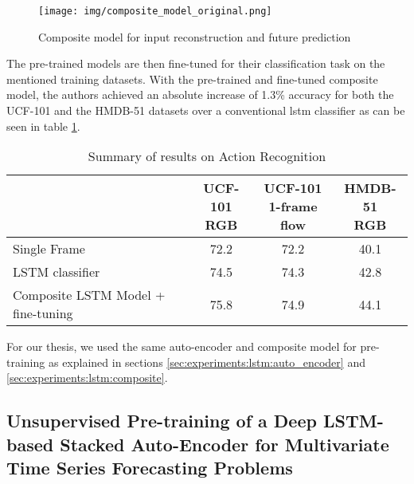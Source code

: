\begin{figure}[h]
	\centering
	\texttt{[image: img/composite\_model\_original.png]}
	\caption{Composite model for input reconstruction and future prediction \cite{unsupervised_learning_lstms}}
	\label{fig:stateofart:unsupervised_lstm_composite}
\end{figure}

The pre-trained models are then fine-tuned for their classification task on the mentioned training datasets. With the pre-trained and fine-tuned composite model, the authors achieved an absolute increase of 1.3\% accuracy for both the UCF-101 and the HMDB-51 datasets over a conventional \gls{lstm} classifier as can be seen in table \ref{table:stateofart:unsupervised_learning_results}.

\begin{table}[]
	\centering
	\begin{tabular}{l c c c}
		\thead{Model} & \thead{UCF-101 \\ RGB} & \thead{UCF-101
\\ 1-frame flow} & \thead{HMDB-51 \\
RGB} \\ \hline
		\midrule
		Single Frame & 72.2 & 72.2 & 40.1 \\
		\midrule
		LSTM classifier & 74.5 & 74.3 & 42.8 \\
		\midrule
		Composite LSTM
Model + fine-tuning & 75.8 & 74.9 & 44.1 \\
	\end{tabular}
	\caption{Summary of results on Action Recognition \cite{unsupervised_learning_lstms}}
	\label{table:stateofart:unsupervised_learning_results}
\end{table}

For our thesis, we used the same auto-encoder and composite model for pre-training as explained in sections \ref{sec:experiments:lstm:auto_encoder} and \ref{sec:experiments:lstm:composite}.

\subsection{Unsupervised Pre-training of a Deep LSTM-based Stacked Auto-Encoder for Multivariate Time Series Forecasting Problems} \label{sec:stateofart:unsupervised_learning_lstms_timeseries}

